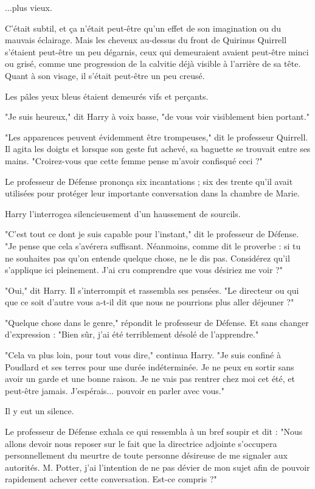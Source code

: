 ...plus vieux.

C'était subtil, et ça n'était peut-être qu'un effet de son imagination ou du mauvais éclairage. Mais les cheveux au-dessus du front de Quirinus Quirrell s'étaient peut-être un peu dégarnis, ceux qui demeuraient avaient peut-être minci ou grisé, comme une progression de la calvitie déjà visible à l'arrière de sa tête. Quant à son visage, il s'était peut-être un peu creusé.

Les pâles yeux bleus étaient demeurés vifs et perçants.

"Je suis heureux," dit Harry à voix basse, "de vous voir visiblement bien portant."

"Les apparences peuvent évidemment être trompeuses," dit le professeur Quirrell. Il agita les doigts et lorsque son geste fut achevé, sa baguette se trouvait entre ses mains. "Croirez-vous que cette femme pense m'avoir confisqué ceci ?"

Le professeur de Défense prononça six incantations ; six des trente qu'il avait utilisées pour protéger leur importante conversation dans la chambre de Marie.

Harry l'interrogea silencieusement d'un haussement de sourcils.

"C'est tout ce dont je suis capable pour l'instant," dit le professeur de Défense. "Je pense que cela s'avérera suffisant. Néanmoins, comme dit le proverbe : si tu ne souhaites pas qu'on entende quelque chose, ne le dis pas. Considérez qu'il s'applique ici pleinement. J'ai cru comprendre que vous désiriez me voir ?"

"Oui," dit Harry. Il s'interrompit et rassembla ses pensées. "Le directeur ou qui que ce soit d'autre vous a-t-il dit que nous ne pourrions plus aller déjeuner ?"

"Quelque chose dans le genre," répondit le professeur de Défense. Et sans changer d'expression : "Bien sûr, j'ai été terriblement désolé de l'apprendre."

"Cela va plus loin, pour tout vous dire," continua Harry. "Je suis confiné à Poudlard et ses terres pour une durée indéterminée. Je ne peux en sortir sans avoir un garde et une bonne raison. Je ne vais pas rentrer chez moi cet été, et peut-être jamais. J'espérais... pouvoir en parler avec vous."

Il y eut un silence.

Le professeur de Défense exhala ce qui ressembla à un bref soupir et dit : "Nous allons devoir nous reposer sur le fait que la directrice adjointe s'occupera personnellement du meurtre de toute personne désireuse de me signaler aux autorités. M. Potter, j'ai l'intention de ne pas dévier de mon sujet afin de pouvoir rapidement achever cette conversation. Est-ce compris ?"

